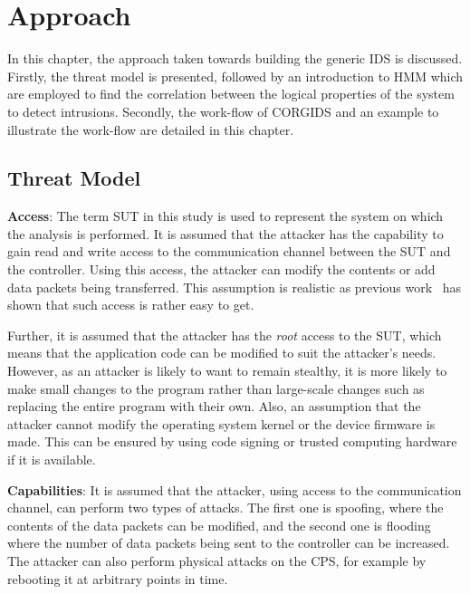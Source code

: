 
\chapter{\textbf{Approach}}
\label{sec3:Approach}

In this chapter, the approach taken towards building the generic \ac{IDS} is discussed.
Firstly, the threat model is presented, followed by an introduction to \ac{HMM} which are employed to find the correlation between the logical properties of the system to detect intrusions. Secondly, the work-flow of \ac{CORGIDS} and an example to illustrate the work-flow are detailed in this chapter. 

\section{Threat Model}
\label{sec:threatModel}
{\bf Access}: The term \ac{SUT} in this study is used to represent the system on which the analysis is performed. It is assumed that the attacker has the capability to gain read and write access to the communication channel between the \ac{SUT} and the controller. Using this access, the attacker can modify the contents or add data packets being transferred. This assumption is realistic as previous work~\cite{ericsson2010cyber} has shown that such access is rather easy to get.

Further, it is assumed that the attacker has the \textit{root} access to the \ac{SUT}, which means that the application code can be modified to suit the attacker's needs. However, as an attacker is likely to want to remain stealthy, it is more likely to make small changes to the program rather than large-scale changes such as replacing the entire program with their own. Also, an assumption that the attacker cannot modify the operating system kernel or the device firmware is made. This can be ensured by using code signing or trusted computing hardware if it is available. 

{\bf Capabilities}: It is assumed that the attacker, using access to the communication channel, can perform two types of attacks. The first one is spoofing, where the contents of the data packets can be modified, and the second one is flooding where the number of data packets being sent to the controller can be increased. The attacker can also perform physical attacks on the \ac{CPS}, for example by rebooting it at arbitrary points in time. 
 
